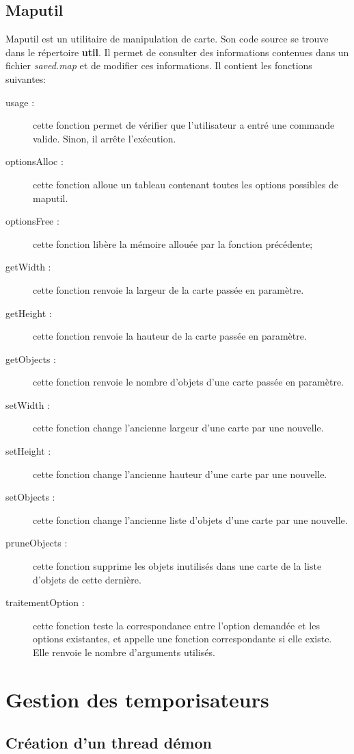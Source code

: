 \documentclass{report}
\begin{document}
\section{Maputil}
Maputil est un utilitaire de manipulation de carte. Son code source se trouve dans le répertoire \textbf{util}. Il permet de consulter des informations contenues dans un fichier \textit{saved.map} et de modifier ces informations. Il contient les fonctions suivantes:
\begin{description}
  \item[usage :] cette fonction permet de vérifier que l'utilisateur a entré une commande valide. Sinon, il arrête l'exécution.
  \item[optionsAlloc :] cette fonction alloue un tableau contenant toutes les options possibles de maputil.
  \item[optionsFree :] cette fonction libère la mémoire allouée par la fonction précédente;
  \item[getWidth :] cette fonction renvoie la largeur de la carte passée en paramètre.
  \item[getHeight :] cette fonction renvoie la hauteur de la carte passée en paramètre.
  \item[getObjects :] cette fonction renvoie le nombre d'objets d'une carte passée en paramètre.
  \item[setWidth :] cette fonction change l'ancienne largeur d'une carte par une nouvelle.
  \item[setHeight :] cette fonction change l'ancienne hauteur d'une carte par une nouvelle.
  \item[setObjects :] cette fonction change l'ancienne liste d'objets d'une carte par une nouvelle.
  \item[pruneObjects :] cette fonction supprime les objets inutilisés dans une carte de la liste d'objets de cette dernière.
  \item[traitementOption :] cette fonction teste la correspondance entre l'option demandée et les options existantes, et appelle une fonction correspondante si elle existe. Elle renvoie le nombre d'arguments utilisés.
\end{description}


\chapter{Gestion des temporisateurs}
\setcounter{section}{0}
\section{Création d'un thread démon}
\end{document}
